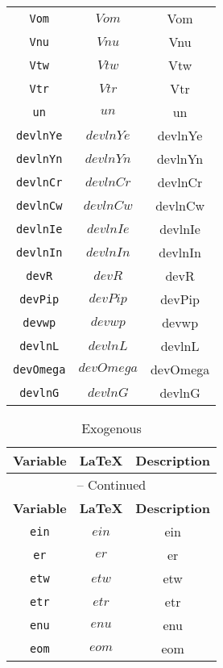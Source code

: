 \begin{center}
\begin{longtable}{ccc}
\texttt{Vom} & $Vom$ & Vom\\
\texttt{Vnu} & $Vnu$ & Vnu\\
\texttt{Vtw} & $Vtw$ & Vtw\\
\texttt{Vtr} & $Vtr$ & Vtr\\
\texttt{un} & $un$ & un\\
\texttt{devlnYe} & $devlnYe$ & devlnYe\\
\texttt{devlnYn} & $devlnYn$ & devlnYn\\
\texttt{devlnCr} & $devlnCr$ & devlnCr\\
\texttt{devlnCw} & $devlnCw$ & devlnCw\\
\texttt{devlnIe} & $devlnIe$ & devlnIe\\
\texttt{devlnIn} & $devlnIn$ & devlnIn\\
\texttt{devR} & $devR$ & devR\\
\texttt{devPip} & $devPip$ & devPip\\
\texttt{devwp} & $devwp$ & devwp\\
\texttt{devlnL} & $devlnL$ & devlnL\\
\texttt{devOmega} & $devOmega$ & devOmega\\
\texttt{devlnG} & $devlnG$ & devlnG\\
\hline%
\end{longtable}
\end{center}
\begin{center}
\begin{longtable}{ccc}
\caption{Exogenous}\\%
\hline%
\multicolumn{1}{c}{\textbf{Variable}} &
\multicolumn{1}{c}{\textbf{\LaTeX}} &
\multicolumn{1}{c}{\textbf{Description}}\\%
\hline\hline%
\endfirsthead
\multicolumn{3}{c}{{\tablename} \thetable{} -- Continued}\\%
\hline%
\multicolumn{1}{c}{\textbf{Variable}} &
\multicolumn{1}{c}{\textbf{\LaTeX}} &
\multicolumn{1}{c}{\textbf{Description}}\\%
\hline\hline%
\endhead
\texttt{ein} & $ein$ & ein\\
\texttt{er} & $er$ & er\\
\texttt{etw} & $etw$ & etw\\
\texttt{etr} & $etr$ & etr\\
\texttt{enu} & $enu$ & enu\\
\texttt{eom} & $eom$ & eom\\
\hline%
\end{longtable}
\end{center}
